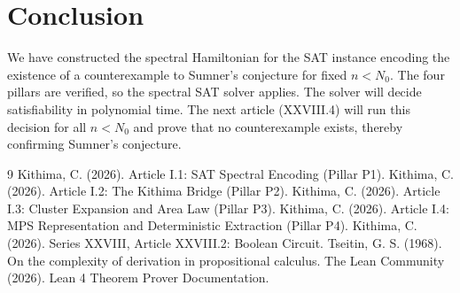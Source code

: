 \documentclass[11pt,a4paper]{article}
\begin{document}
\section{Conclusion}
We have constructed the spectral Hamiltonian for the SAT instance encoding the existence of a counterexample to Sumner's conjecture for fixed $n < N_0$. The four pillars are verified, so the spectral SAT solver applies. The solver will decide satisfiability in polynomial time. The next article (XXVIII.4) will run this decision for all $n < N_0$ and prove that no counterexample exists, thereby confirming Sumner's conjecture.


\begin{thebibliography}{9}
  Kithima, C. (2026). Article I.1: SAT Spectral Encoding (Pillar P1).
  Kithima, C. (2026). Article I.2: The Kithima Bridge (Pillar P2).
  Kithima, C. (2026). Article I.3: Cluster Expansion and Area Law (Pillar P3).
  Kithima, C. (2026). Article I.4: MPS Representation and Deterministic Extraction (Pillar P4).
  Kithima, C. (2026). Series XXVIII, Article XXVIII.2: Boolean Circuit.
  Tseitin, G. S. (1968). On the complexity of derivation in propositional calculus.
  The Lean Community (2026). Lean 4 Theorem Prover Documentation.
\end{thebibliography}
\end{document}
